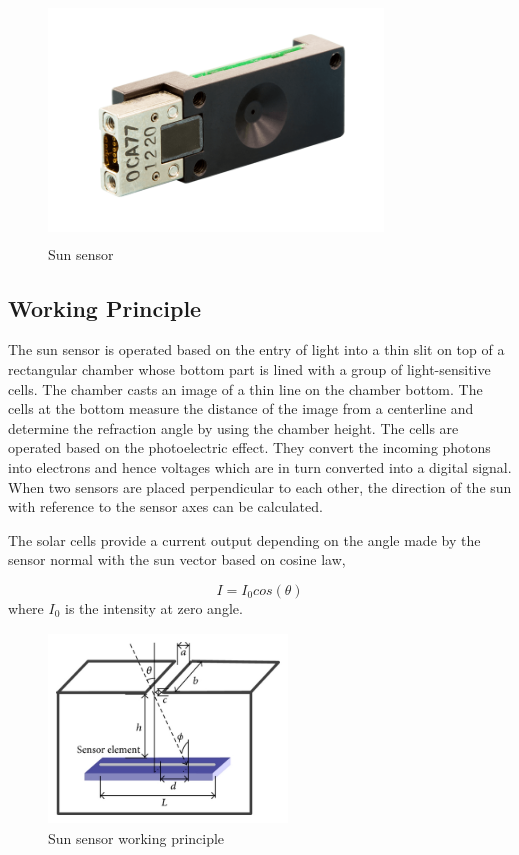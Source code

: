 \begin{figure}[!h]
	\centering
	\includegraphics[width=3.5in,height=2.5in]{./images/sunsensor.png}
	\caption{Sun sensor}
	\label{sunsensorimg}
\end{figure}


\subsection{Working Principle}

The sun sensor is operated based on the entry of light into a thin slit on top of a rectangular chamber whose bottom part is lined with a group of light-sensitive cells. The chamber casts an image of a thin line on the chamber bottom. The cells at the bottom measure the distance of the image from a centerline and determine the refraction angle by using the chamber height.
The cells are operated based on the photoelectric effect. They convert the incoming photons into electrons and hence voltages which are in turn converted into a digital signal. When two sensors are placed perpendicular to each other, the direction of the sun with reference to the sensor axes can be calculated.

\vspace{15pt}

The solar cells provide a current output depending on the angle made by the sensor normal with the sun vector based on cosine law,

$$I = I_0 cos(\theta)$$
where $I_0$ is the intensity at zero angle.

\begin{figure}[!h]
	\centering
	\includegraphics[width=2.5in,height=2in]{./images/sun sensor_w.jpg}
	\caption{Sun sensor working principle}
	\label{sunsensorw}
\end{figure}


